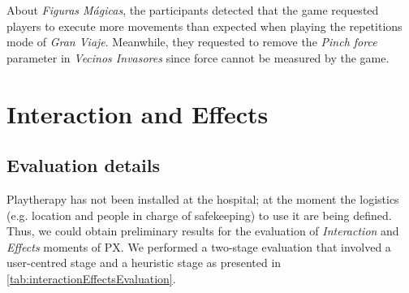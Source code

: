 About \textit{Figuras Mágicas}, the participants detected that the game requested players to execute more movements than expected when playing the repetitions mode of \textit{Gran Viaje}. Meanwhile, they requested to remove the \textit{Pinch force} parameter in \textit{Vecinos Invasores} since force cannot be measured by the game.

\section{Interaction and Effects}
\label{sec:interaction_eval}
\subsection{Evaluation details}
Playtherapy has not been installed at the hospital; at the moment the logistics (e.g. location and people in charge of safekeeping) to use it are being defined. Thus, we could obtain preliminary results for the evaluation of \emph{Interaction} and \emph{Effects} moments of \ac{PX}. We performed a two-stage evaluation that involved a user-centred stage and a heuristic stage as presented in \autoref{tab:interactionEffectsEvaluation}.

\begin{table}[bth]
\caption{Two-stages evaluation to assess the interaction and effects moments of \ac{PX} in Playtherapy}
\myfloatalign
{}
\label{tab:interactionEffectsEvaluation}
\end{table}

